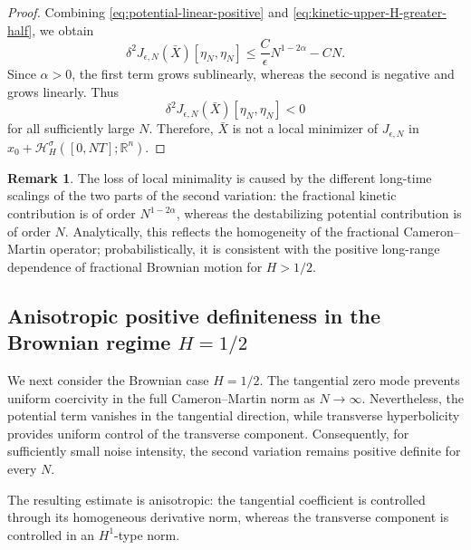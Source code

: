 \documentclass[preprint,12pt]{elsarticle}
\theoremstyle{definition}
\newtheorem{remark}{Remark}[section]
\theoremstyle{plain}
\begin{document}
\begin{proof}
Combining \eqref{eq:potential-linear-positive} and
\eqref{eq:kinetic-upper-H-greater-half}, we obtain
\begin{equation}
\label{eq:second-var-final-estimate}
    \delta^2J_{\epsilon,N}(\bar X)[\eta_N,\eta_N]
    \leq
    \frac{C}{\epsilon}N^{1-2\alpha}
    -
    CN.
\end{equation}
Since $\alpha>0$, the first term grows sublinearly, whereas the second
is negative and grows linearly. Thus
\begin{equation*}
    \delta^2J_{\epsilon,N}(\bar X)[\eta_N,\eta_N]<0
\end{equation*}
for all sufficiently large $N$. Therefore, $\bar X$ is not a local
minimizer of $J_{\epsilon,N}$ in
$x_0+\mathcal H_H^\sigma([0,NT];\mathbb R^n)$.
\end{proof}

\begin{remark}
The loss of local minimality is caused by the different long-time
scalings of the two parts of the second variation: the fractional
kinetic contribution is of order $N^{1-2\alpha}$, whereas the
destabilizing potential contribution is of order $N$. Analytically,
this reflects the homogeneity of the fractional Cameron--Martin
operator; probabilistically, it is consistent with the positive
long-range dependence of fractional Brownian motion for $H>1/2$.
\end{remark}




\subsection{Anisotropic positive definiteness in the Brownian regime
$H=1/2$}

We next consider the Brownian case $H=1/2$. The tangential zero mode
prevents uniform coercivity in the full Cameron--Martin norm as
$N\to\infty$. Nevertheless, the potential term vanishes in the
tangential direction, while transverse hyperbolicity provides uniform
control of the transverse component. Consequently, for sufficiently
small noise intensity, the second variation remains positive definite
for every $N$.

The resulting estimate is anisotropic: the tangential coefficient is
controlled through its homogeneous derivative norm, whereas the
transverse component is controlled in an $H^1$-type norm.
\end{document}
